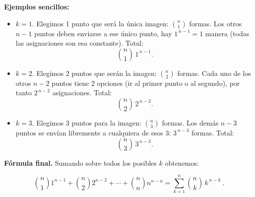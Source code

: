 \documentclass[a4paper,12pt]{article}
\begin{document}
\begin{ejercicio}[title=Ejercicio 22 (⋆)]

\textbf{Ejemplos sencillos:}
\begin{itemize}
  \item \(k=1\). Elegimos 1 punto que será la única imagen: \(\binom{n}{1}\) formas. Los otros \(n-1\) puntos deben enviarse a ese único punto, hay \(1^{\,n-1}=1\) manera (todas las asignaciones son esa constante). Total:
  \[
  \binom{n}{1}\,1^{\,n-1}.
  \]
  \item \(k=2\). Elegimos 2 puntos que serán la imagen: \(\binom{n}{2}\) formas. Cada uno de los otros \(n-2\) puntos tiene 2 opciones (ir al primer punto o al segundo), por tanto \(2^{\,n-2}\) asignaciones. Total:
  \[
  \binom{n}{2}\,2^{\,n-2}.
  \]
  \item \(k=3\). Elegimos 3 puntos para la imagen: \(\binom{n}{3}\) formas. Los demás \(n-3\) puntos se envían libremente a cualquiera de esos 3: \(3^{\,n-3}\) formas. Total:
  \[
  \binom{n}{3}\,3^{\,n-3}.
  \]
\end{itemize}

\bigskip

\textbf{Fórmula final.} Sumando sobre todos los posibles \(k\) obtenemos:

\[
\binom{n}{1}1^{n-1} + \binom{n}{2}2^{n-2}+ \cdots + \binom{n}{n}n^{n-n} = \boxed{\sum_{k=1}^{n} \binom{n}{k}\,k^{\,n-k}\ }.
\]

\end{ejercicio}
\end{document}
